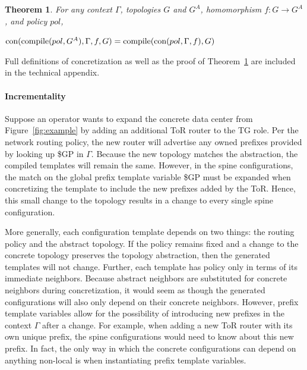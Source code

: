\documentclass[numbers, 10pt]{sigplanconf}
\newcommand{\para}[1]{\paragraph*{\textbf{#1}}}
\newtheorem{thm}{Theorem}[section]
\newcommand{\Appendix}{technical appendix\xspace}
\begin{document}
\begin{thm}
  For any context $\Gamma$, topologies $G$ and $G^A$, homomorphism $f : G \rightarrow G^A$, and policy $pol$,

  \vspace{1em}
  \noindent
  $\text{con}(\text{compile}(pol,G^A), \Gamma,f,G) = \text{compile}(\text{con}(pol,\Gamma,f),G)$
  \label{thm:concretization}
\end{thm}
%
\vspace{-.6em}
Full definitions of concretization as well as the proof of Theorem~\ref{thm:concretization} are included in the \Appendix. 

\para{Incrementality}

Suppose an operator wants to expand the concrete data center from Figure~\ref{fig:example} by adding an additional ToR router to the TG role. Per the network routing policy, the new router will advertise any owned prefixes provided by looking up {\small \$GP} in $\Gamma$. Because the new topology matches the abstraction, the compiled templates will remain the same. However, in the spine configurations, the match on the global prefix template variable {\small \$GP} must be expanded when concretizing the template to include the new prefixes added by the ToR. Hence, this small change to the topology results in a change to every single spine configuration.

More generally, each configuration template depends on two things: the routing policy and the abstract topology. If the policy remains fixed and a change to the concrete topology preserves the topology abstraction, then the generated templates will not change. Further, each template has policy only in terms of its immediate neighbors. Because abstract neighbors are substituted for concrete neighbors during concretization, it would seem as though the generated configurations will also only depend on their concrete neighbors. However, prefix template variables allow for the possibility of introducing new prefixes in the context $\Gamma$ after a change. For example, when adding a new ToR router with its own unique prefix, the spine configurations would need to know about this new prefix.
%
In fact, the only way in which the concrete configurations can depend on anything non-local is when instantiating prefix template variables. 
\end{document}
